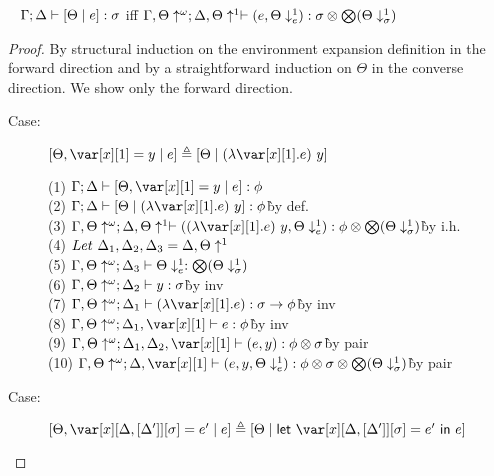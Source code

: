\documentclass[acmsmall,review,anonymous,screen]{acmart}
\newcommand{\llet}[2]{\mathsf{let}~#1~\mathsf{in}~#2}
\begin{document}
 \begin{lemma}~\label{lem:unwrapenv}
   $\Gamma ; \Delta \vdash [ \Theta \mid e] : \sigma$
     iff $\Gamma , \Theta\uparrow^{\omega} ; \Delta , \Theta\uparrow^1 \vdash  (e, \Theta\downarrow^1_e) : \sigma \otimes \bigotimes(\Theta\downarrow^1_\sigma)$
   \end{lemma}
\begin{proof}
By structural induction on the environment expansion definition in the
forward direction and by a straightforward induction on $\Theta$ in the
converse direction. We show only the forward direction.
\begin{description}
\item[Case:] $\left[\Theta, \xl = y \mid e\right] \triangleq \left[\Theta \mid (\lambda \xl. e)~y\right]$
\begin{tabbing}
    (1) $\G; \D \vdash \left[ \Theta, \xl = y \mid e \right] : \phi$\\
    (2) $\G; \D \vdash \left[ \Theta \mid (\lambda \xl. e)~y \right] : \phi$\` by def.\\
    (3) $\G, \Theta\uparrow^\omega; \D, \Theta\uparrow^1 \vdash ((\lambda \xl. e)~y, \Theta\downarrow^1_e) : \phi \otimes \bigotimes(\Theta\downarrow^1_\sigma)$\` by i.h.\\
    (4) $Let~\Delta_1,\Delta_2,\Delta_3 = \Delta, \Theta\uparrow^1 $\\
    (5) $\Gamma, \Theta\uparrow^\omega; \Delta_3 \vdash \Theta\downarrow^1_e : \bigotimes(\Theta\downarrow^1_\sigma)$\\
    (6) $\Gamma, \Theta\uparrow^\omega; \Delta_2 \vdash y : \sigma$\` by inv\\
    (7) $\G, \Theta\uparrow^\omega; \D_1 \vdash (\lambda \xl. e) : \s \to \phi $\` by inv\\
    (8) $\G, \Theta\uparrow^\omega; \D_1, \xl \vdash e : \phi $\` by inv\\
    (9) $\G, \Theta\uparrow^\omega; \D_1, \D_2, \xl \vdash (e, y) : \phi \otimes \sigma$\` by pair\\
    (10) $\G, \Theta\uparrow^\omega; \D, \xl \vdash (e, y, \Theta\downarrow^1_e) : \phi \otimes \sigma \otimes \bigotimes(\Theta\downarrow^1_\sigma)$\` by pair\\
\end{tabbing}
\item[Case:] $\left[\Theta, \xD = e' \mid e\right] \triangleq \left[\Theta \mid \llet{\xD = e'}{e}\right]$
\begin{tabbing}

\end{tabbing}
\end{description}
\end{proof}
\end{document}
